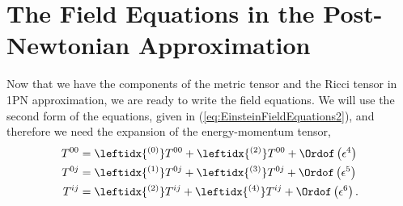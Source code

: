 \section{The Field Equations in the Post-Newtonian Approximation}
Now that we have the components of the metric tensor and the Ricci tensor in 1PN approximation, we are ready to write the field equations. We will use the second form of the equations, given in (\ref{eq:EinsteinFieldEquations2}), and therefore we need the expansion of the energy-momentum tensor,
\begin{subequations}
\begin{align}
T^{00} &= \leftidx{ ^{(0)}} T^{00} + \leftidx{ ^{(2)}} T^{00} + \Ordof \left( \epsilon^4 \right) \\
T^{0j} &= \leftidx{ ^{(1)}} T^{0j} + \leftidx{ ^{(3)}} T^{0j} + \Ordof \left( \epsilon^5 \right) \\
T^{ij} &= \leftidx{ ^{(2)}} T^{ij} + \leftidx{ ^{(4)}} T^{ij} + \Ordof \left( \epsilon^6 \right).
\end{align}
\end{subequations}

